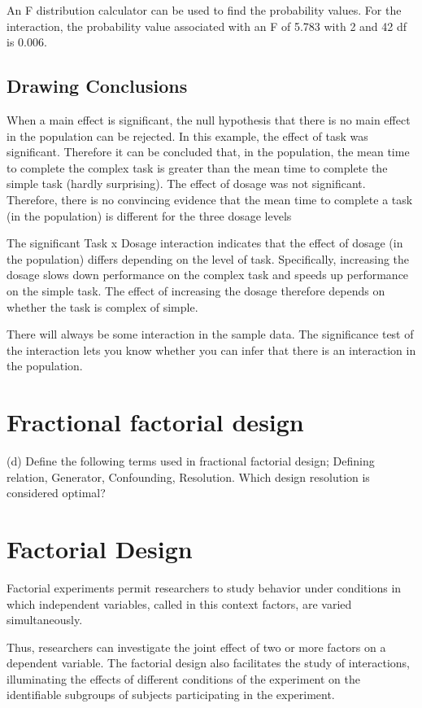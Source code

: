 An F distribution calculator can be used to find the probability values. For the interaction, the probability value associated with an F of 5.783 with 2 and 42 df is 0.006.

\subsection{Drawing Conclusions}

When a main effect is significant, the null hypothesis that there is no main effect in the population can be rejected. In this example, the effect of task was significant. Therefore it can be concluded that, in the population, the mean time to complete the complex task is greater than the mean time to complete the simple task (hardly surprising). The effect of dosage was not significant. Therefore, there is no convincing evidence that the mean time to complete a task (in the population) is different for the three dosage levels

The significant Task x Dosage interaction indicates that the effect of dosage (in the population) differs depending on the level of task. Specifically, increasing the dosage slows down performance on the complex task and speeds up performance on the simple task. The effect of increasing the dosage therefore depends on whether the task is complex of simple.

There will always be some interaction in the sample data. The significance test of the interaction lets you know whether you can infer that there is an interaction in the population.



\section{Fractional factorial design}

(d)	Define the following terms used in fractional factorial design; Defining relation,
Generator, Confounding, Resolution. Which design resolution is considered
optimal?
\section{Factorial Design}
Factorial experiments permit researchers to study behavior under conditions in which independent variables, called in this context factors, are varied simultaneously.

Thus, researchers can investigate the joint effect of two or more factors on a dependent variable. The factorial design also facilitates the study of interactions, illuminating the effects of different conditions of the experiment on the identifiable subgroups of subjects participating in the experiment.


